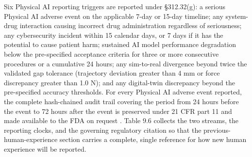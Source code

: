 Six Physical AI reporting triggers are reported
under \S 312.32(g): a serious Physical AI adverse event on the applicable 7-day or
15-day timeline; any system-drug interaction causing incorrect drug administration
regardless of seriousness; any cybersecurity incident within 15 calendar days, or
7 days if it has the potential to cause patient harm; sustained AI model
performance degradation below the pre-specified acceptance criteria for three or
more consecutive procedures or a cumulative 24 hours; any sim-to-real divergence
beyond twice the validated gap tolerance (trajectory deviation greater than 4 mm or
force discrepancy greater than 1.0 N); and any digital-twin discrepancy beyond the
pre-specified accuracy thresholds. For every Physical AI adverse event reported,
the complete hash-chained audit trail covering the period from 24 hours before the
event to 72 hours after the event is preserved under 21 CFR part 11 and made
available to the FDA on request \cite{cfr312paiuni, cfr050paiuni}. Table 9.6
collects the two streams, the reporting clocks, and the governing regulatory
citation so that the previous-human-experience section carries a complete, single
reference for how new human experience will be reported.

